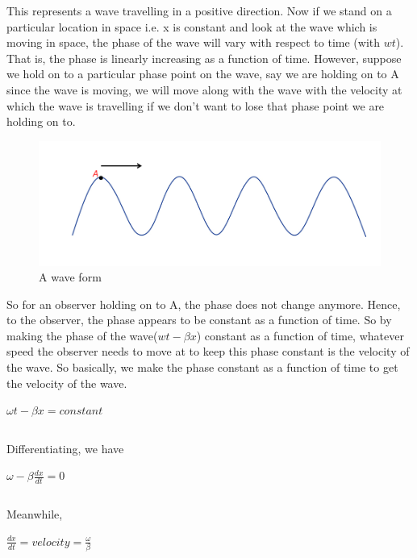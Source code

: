 This represents a wave travelling in a positive direction. Now if we stand on a particular location in space i.e. x is constant and look at the wave which is moving in space, the phase of the wave will vary with respect to time (with $wt$). That is, the phase is linearly increasing as a function of time. However, suppose we hold on to a particular phase point on the wave, say we are holding on to A since the wave is moving, we will move along with the wave with the velocity at which the wave is travelling if we don't want to lose that phase point we are holding on to.
\begin{figure}[h]
\centering
\includegraphics[width=1\linewidth]{graphics/constant_phase}
\caption{A wave form}
\end{figure}

So for an observer holding on to A, the phase does not change anymore. Hence, to the observer, the phase appears to be constant as a function of time. So by making the phase of the wave($wt - \beta x$) constant as a function of time, whatever speed the observer needs to move at to keep this phase constant is the velocity of the wave. So basically, we make the phase constant as a function of time to get the velocity of the wave.
\begin{center}
$\omega t-\beta x = constant$
\end{center}
\begin{equation}\end{equation}

Differentiating, we have
\begin{center}
$\omega-\beta\frac{dx}{dt}=0$
\end{center}
\begin{equation}\end{equation}

Meanwhile, 
\begin{center}
$\frac{dx}{dt}=velocity=\frac{\omega}{\beta}$
\end{center}
\begin{equation}\end{equation}


